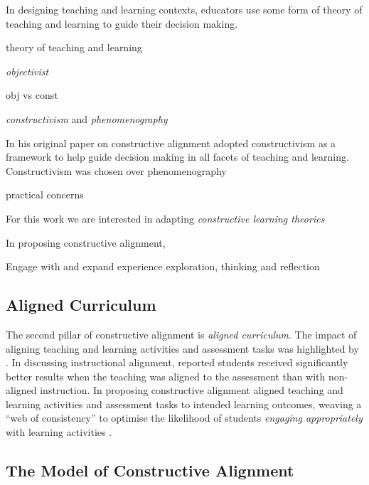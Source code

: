 In designing teaching and learning contexts, educators use some form of theory of teaching and learning to guide their decision making.

theory of teaching and learning



\cite{Biggs:1996c}

\emph{objectivist} 

\cite{Vrasidas:2000} obj vs const

\emph{constructivism} and \emph{phenomenography}


\cite{Duffy:1996} 




\cite{Montessori:1946}


In his original paper on constructive alignment \citet{Biggs:1996c} adopted constructivism as a framework to help guide decision making in all facets of teaching and learning. Constructivism was chosen over phenomenography 

practical concerns


For this work we are interested in adapting \emph{constructive learning theories}

In proposing constructive alignment, 


Engage with and expand experience \cite{Dewey:1960} exploration, thinking and reflection


\subsection{Aligned Curriculum} %
\label{sub:aligned_curriculum}

The second pillar of constructive alignment is \emph{aligned curriculum}. The impact of aligning teaching and learning activities and assessment tasks was highlighted by \citet{Cohen:1987}. In discussing instructional alignment, \citet{Cohen:1987} reported students received significantly better results when the teaching was aligned to the assessment than with non-aligned instruction. In proposing constructive alignment \citet{Biggs:1996c} aligned teaching and learning activities and assessment tasks to intended learning outcomes, weaving a ``web of consistency'' to optimise the likelihood of students \emph{engaging appropriately} with learning activities \cite{Biggs:1999}. 


\subsection{The Model of Constructive Alignment} %
\label{sub:the_model_of_constructive_alignment}

